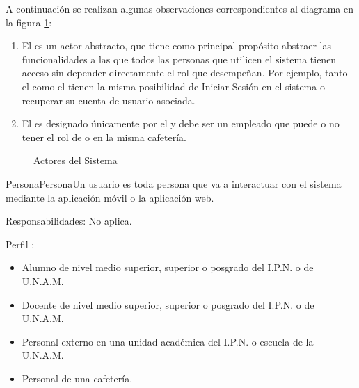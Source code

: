 A continuación se realizan algunas observaciones correspondientes al diagrama en la figura \ref{fig:actores}:
	\begin{enumerate}
		\item El  es un actor abstracto, que tiene como principal propósito abstraer las funcionalidades a las que todos las personas que utilicen el sistema tienen acceso sin depender directamente el rol que desempeñan. Por ejemplo, tanto el  como el  tienen la misma posibilidad de Iniciar Sesión en el sistema o recuperar su cuenta de usuario asociada.
		\item El  es designado únicamente por el  y debe ser un empleado que puede o no tener el rol de  o  en la misma cafetería.
	\end{enumerate}
	
	\begin{figure}[hbtp!]
	\begin{center}
		\caption{Actores del Sistema}
		\label{fig:actores}
	\end{center}
\end{figure}


\begin{Actor}{Persona}{Persona}{Un usuario es toda persona que va a interactuar con el sistema mediante la aplicación móvil o la aplicación web.}
	\item[Responsabilidades:] No aplica.
	\item[Perfil]:\hspace{1pt}
		\begin{itemize}
			\item Alumno de nivel medio superior, superior o posgrado del I.P.N. o de U.N.A.M.
			\item Docente de nivel medio superior, superior o posgrado del I.P.N. o de U.N.A.M.
			\item Personal externo en una unidad académica del I.P.N. o escuela de la U.N.A.M.
			\item Personal de una cafetería.
		\end{itemize}
\end{Actor}


